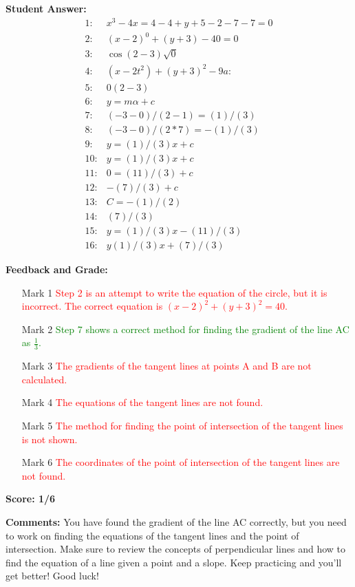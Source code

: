 \documentclass{article}
\begin{document}
\textbf{Student Answer:}
\begin{align*}
1: & x^3-4x=4-4+y+5-2-7-7=0 \\
2: & (x-2)^0+(y+3)-40=0 \\
3: & \cos(2 -3) \sqrt{0} \\
4: & (x-2t^2)+(y+3)^2-9a: \\
5: & 0(2 -3) \\
6: & y=m \alpha+c \\
7: & (-3-0)/(2-1)=(1)/(3) \\
8: & (-3-0)/(2*7)=-(1)/(3) \\
9: & y=(1)/(3)x+c \\
10: & y=(1)/(3)x+c \\
11: & 0=(11)/(3)+c \\
12: & -(7)/(3)+c \\
13: & C=-(1)/(2) \\
14: & (7)/(3) \\
15: & y=(1)/(3)x-(11)/(3) \\
16: & y(1)/(3)x+(7)/(3)
\end{align*}

\textbf{Feedback and Grade:}
\begin{itemize}
\item[Mark 1] \textcolor{red}{Step 2 is an attempt to write the equation of the circle, but it is incorrect. The correct equation is $(x-2)^2+(y+3)^2=40$.}
\item[Mark 2] \textcolor{green}{Step 7 shows a correct method for finding the gradient of the line AC as $\frac{1}{3}$.}
\item[Mark 3] \textcolor{red}{The gradients of the tangent lines at points A and B are not calculated.}
\item[Mark 4] \textcolor{red}{The equations of the tangent lines are not found.}
\item[Mark 5] \textcolor{red}{The method for finding the point of intersection of the tangent lines is not shown.}
\item[Mark 6] \textcolor{red}{The coordinates of the point of intersection of the tangent lines are not found.}
\end{itemize}

\textbf{Score: 1/6}

\textbf{Comments:} You have found the gradient of the line AC correctly, but you need to work on finding the equations of the tangent lines and the point of intersection. Make sure to review the concepts of perpendicular lines and how to find the equation of a line given a point and a slope. Keep practicing and you'll get better! Good luck!
\end{document}
